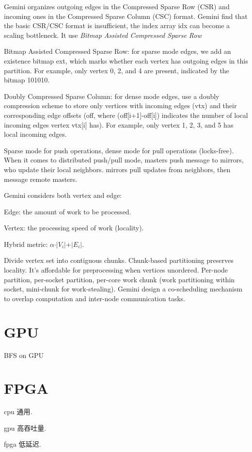\documentclass[UTF8,12pt,a4paper]{article}
\begin{document}
Gemini organizes outgoing edges in the Compressed Sparse Row (CSR)
and incoming ones in the Compressed Sparse Column (CSC) format.
Gemini find that the basic CSR/CSC format is insufficient,
the index array idx can become a scaling bottleneck.
It use \textit{Bitmap Assisted Compressed Sparse Row}

Bitmap Assisted Compressed Sparse Row:
for sparse mode edges, we add an existence bitmap ext,
which marks whether each vertex has outgoing edges in this partition.
For example, only vertex 0, 2, and 4 are present,
indicated by the bitmap 101010.

Doubly Compressed Sparse Column: for dense mode edges,
use a doubly compression scheme
to store only vertices with incoming edges (vtx)
and their corresponding edge offsets (off, where
(off[i+1]-off[i]) indicates the number of local
incoming edges vertex vtx[i] has).
For example, only vertex 1, 2, 3, and 5 has local incoming edges.

Sparse mode for push operations, dense mode for pull operations (locks-free).
When it comes to distributed push/pull mode,
masters	push message to mirrors, who update	their	local	neighbors.
mirrors	pull updates from	neighbors, then	message	remote masters.

Gemini considers both	vertex and edge:
\begin{compactitem}
  \item Edge:	the	amount of	work to	be processed.
  \item Vertex:	the	processing speed of	work (locality).
  \item Hybrid metric: $\alpha \cdot \vert V_i \vert + \vert E_i \vert$.
\end{compactitem}

Divide vertex	set into contiguous chunks.
Chunk-based partitioning preserves locality.
It's affordable	for preprocessing	when vertices	unordered.
Per-node partition, per-socket partition, per-core work chunk
(work partitioning within socket, mini-chunk for work-stealing).
Gemini design a co-scheduling mechanism to
overlap computation and inter-node communication tasks.
\clearpage

\section{GPU}
BFS on GPU~\cite{DBLP:conf/sc/LiuH15}
\clearpage

\section{FPGA}
\begin{compactitem}
  \item cpu 通用.
  \item gpu 高吞吐量.
  \item fpga 低延迟.
\end{compactitem}
\end{document}
